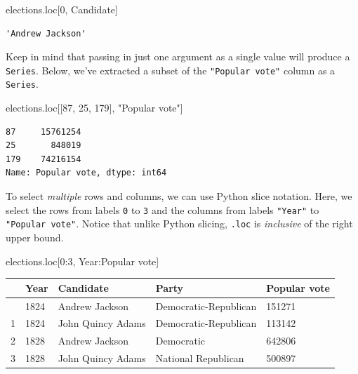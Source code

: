 \documentclass[
  letterpaper,
  DIV=11,
  numbers=noendperiod]{scrreprt}
\newenvironment{Shaded}{\begin{snugshade}}{\end{snugshade}}
\newcommand{\DecValTok}[1]{\textcolor[rgb]{0.68,0.00,0.00}{#1}}
\newcommand{\NormalTok}[1]{\textcolor[rgb]{0.00,0.23,0.31}{#1}}
\newcommand{\StringTok}[1]{\textcolor[rgb]{0.13,0.47,0.30}{#1}}
\begin{document}
\begin{Shaded}
\begin{Highlighting}[]
\NormalTok{elections.loc[}\DecValTok{0}\NormalTok{, }\StringTok{\textquotesingle{}Candidate\textquotesingle{}}\NormalTok{]}
\end{Highlighting}
\end{Shaded}

\begin{verbatim}
'Andrew Jackson'
\end{verbatim}

Keep in mind that passing in just one argument as a single value will
produce a \texttt{Series}. Below, we've extracted a subset of the
\texttt{"Popular\ vote"} column as a \texttt{Series}.

\begin{Shaded}
\begin{Highlighting}[]
\NormalTok{elections.loc[[}\DecValTok{87}\NormalTok{, }\DecValTok{25}\NormalTok{, }\DecValTok{179}\NormalTok{], }\StringTok{"Popular vote"}\NormalTok{]}
\end{Highlighting}
\end{Shaded}

\begin{verbatim}
87     15761254
25       848019
179    74216154
Name: Popular vote, dtype: int64
\end{verbatim}

To select \emph{multiple} rows and columns, we can use Python slice
notation. Here, we select the rows from labels \texttt{0} to \texttt{3}
and the columns from labels \texttt{"Year"} to \texttt{"Popular\ vote"}.
Notice that unlike Python slicing, \texttt{.loc} is \emph{inclusive} of
the right upper bound.

\begin{Shaded}
\begin{Highlighting}[]
\NormalTok{elections.loc[}\DecValTok{0}\NormalTok{:}\DecValTok{3}\NormalTok{, }\StringTok{\textquotesingle{}Year\textquotesingle{}}\NormalTok{:}\StringTok{\textquotesingle{}Popular vote\textquotesingle{}}\NormalTok{]}
\end{Highlighting}
\end{Shaded}

\begin{longtable}[]{@{}lllll@{}}
\toprule\noalign{}
& Year & Candidate & Party & Popular vote \\
\midrule\noalign{}
\endhead
\bottomrule\noalign{}
\endlastfoot
0 & 1824 & Andrew Jackson & Democratic-Republican & 151271 \\
1 & 1824 & John Quincy Adams & Democratic-Republican & 113142 \\
2 & 1828 & Andrew Jackson & Democratic & 642806 \\
3 & 1828 & John Quincy Adams & National Republican & 500897 \\
\end{longtable}
\end{document}
